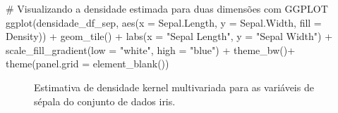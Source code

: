 \documentclass[
  a4paperpaper,
]{article}
\newenvironment{Shaded}{\begin{snugshade}}{\end{snugshade}}
\newcommand{\AttributeTok}[1]{\textcolor[rgb]{0.40,0.45,0.13}{#1}}
\newcommand{\CommentTok}[1]{\textcolor[rgb]{0.37,0.37,0.37}{#1}}
\newcommand{\FunctionTok}[1]{\textcolor[rgb]{0.28,0.35,0.67}{#1}}
\newcommand{\NormalTok}[1]{\textcolor[rgb]{0.00,0.23,0.31}{#1}}
\newcommand{\SpecialCharTok}[1]{\textcolor[rgb]{0.37,0.37,0.37}{#1}}
\newcommand{\StringTok}[1]{\textcolor[rgb]{0.13,0.47,0.30}{#1}}
\begin{document}
\begin{Shaded}
\begin{Highlighting}[]
\CommentTok{\# Visualizando a densidade estimada para duas dimensões com GGPLOT}
\FunctionTok{ggplot}\NormalTok{(densidade\_df\_sep, }\FunctionTok{aes}\NormalTok{(}\AttributeTok{x =}\NormalTok{ Sepal.Length, }\AttributeTok{y =}\NormalTok{ Sepal.Width, }\AttributeTok{fill =}\NormalTok{ Density)) }\SpecialCharTok{+}
  \FunctionTok{geom\_tile}\NormalTok{() }\SpecialCharTok{+}
  \FunctionTok{labs}\NormalTok{(}\AttributeTok{x =} \StringTok{"Sepal Length"}\NormalTok{,}
       \AttributeTok{y =} \StringTok{"Sepal Width"}\NormalTok{) }\SpecialCharTok{+}
  \FunctionTok{scale\_fill\_gradient}\NormalTok{(}\AttributeTok{low =} \StringTok{"white"}\NormalTok{, }\AttributeTok{high =} \StringTok{"blue"}\NormalTok{) }\SpecialCharTok{+}
  \FunctionTok{theme\_bw}\NormalTok{()}\SpecialCharTok{+}
  \FunctionTok{theme}\NormalTok{(}\AttributeTok{panel.grid =} \FunctionTok{element\_blank}\NormalTok{())}
\end{Highlighting}
\end{Shaded}

\begin{figure}[H]


\caption{\label{fig-densidadeiris2}Estimativa de densidade kernel
multivariada para as variáveis de sépala do conjunto de dados iris.}

\end{figure}%
\end{document}

